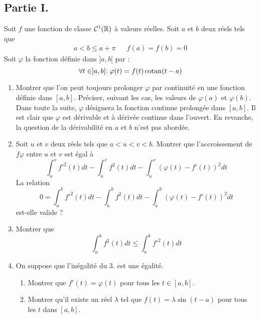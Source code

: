 \subsection*{Partie I.} 
Soit $f$ une fonction de classe ${\cal{C}}^{1}(\mathbb{R})$ à valeurs réelles. Soit $a$ et $b$ deux réels tels que
\begin{align*}
 a<b\leq a+\pi & & f(a)=f(b)=0
\end{align*}
Soit $\varphi$ la fonction définie dans $]a,b[$ par :
\begin{displaymath}
 \forall t \in ]a,b[ : \varphi(t)=f(t)\operatorname{cotan} (t-a)
\end{displaymath}
\begin{enumerate}
 \item Montrer que l'on peut toujours prolonger $\varphi$ par continuité en une fonction définie dans $[a,b]$.  Préciser, suivant les cas, les valeurs de $\varphi(a)$ et $\varphi(b)$.\newline
Dans toute la suite, $\varphi$ désignera la fonction continue prolongée dans $[a,b]$. Il est clair que $\varphi$ est dérivable et à dérivée continue dans l'ouvert. En revanche, la question de la dérivabilité en $a$ et $b$ n'est pas abordée. 
\item Soit $u$ et $v$ deux réels tels que $a<u<v<b$.\newline
Montrer que l'accroissement de $f\varphi$ entre $u$ et $v$ est égal à
\begin{displaymath}
 \int_u^vf'^2(t)dt - \int_u^vf^2(t)dt 
-\int_u^v\left( \varphi(t) - f'(t)\right)^2dt 
\end{displaymath}
La relation
\begin{displaymath}
 0=\int_a^bf'^2(t)dt - \int_a^bf^2(t)dt 
-\int_a^b\left( \varphi(t) - f'(t)\right)^2dt 
\end{displaymath}
est-elle valide ?
\item Montrer que
\begin{displaymath}
 \int_a^bf^2(t)dt \leq  \int_a^bf'^2(t)dt 
\end{displaymath}
\item On suppose que l'inégalité du 3. est une égalité.
\begin{enumerate}
\item Montrer que $f'(t)=\varphi(t)$ pour tous les $t\in[a,b]$.
\item Montrer qu'il existe un réel $\lambda$ tel que $f(t)=\lambda \sin(t-a)$ pour tous les $t$ dans $[a,b]$.
\end{enumerate}
\end{enumerate}

